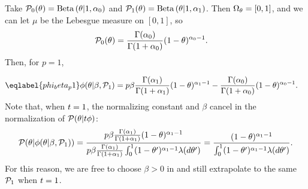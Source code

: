 \begin{ex}
%
Take $\mathcal{P}_{0}(\theta) = \mathrm{Beta}\left(\theta \vert 1, \alpha_0\right)$ and $\mathcal{P}_{1}(\theta) =
\mathrm{Beta}\left(\theta \vert 1, \alpha_1\right)$.  Then $\Omega_{\theta}=[0,1]$, and we can let
$\mu$ be the Lebesgue measure on $[0,1]$, so
%
\begin{align*}
%
\pbase(\theta) ={}&
    \frac{\Gamma(\alpha_0)}{\Gamma(1 + \alpha_0)} (1 - \theta)^{\alpha_0 - 1}.
%
\end{align*}
%
Then, for $p = 1$,

\begin{align}\eqlabel{phi_beta_p1}
%
\phi(\theta \vert \beta, \palt) ={}&
    p \beta \frac{\Gamma(\alpha_1)}{\Gamma(1 + \alpha_1)}
        (1 - \theta)^{\alpha_1 - 1} -
    \frac{\Gamma(\alpha_0)}{\Gamma(1 + \alpha_0)}
        (1 - \theta)^{\alpha_0 - 1}.
%
\end{align}
%
Note that, when $t = 1$, the normalizing constant and $\beta$ cancel in the
normalization of $\mathcal{P}(\theta \vert t \phi)$:
%
\begin{align*}
%
\p(\theta \vert \phi(\theta \vert \beta, \palt)) =
\frac{p \beta \frac{\Gamma(\alpha_1)}{\Gamma(1 + \alpha_1)}
        (1 - \theta)^{\alpha_1 - 1}}
     {p \beta \frac{\Gamma(\alpha_1)}{\Gamma(1 + \alpha_1)}
       \int_0^1 (1 - \theta')^{\alpha_1 - 1} \lambda(d\theta')}
=
\frac{(1 - \theta)^{\alpha_1 - 1}}
     {\int_0^1 (1 - \theta')^{\alpha_1 - 1} \lambda(d\theta')}.
%
\end{align*}
%
For this reason, we are free to choose $\beta > 0$ in 
and still extrapolate to the same $\mathcal{P}_{1}$ when $t = 1$.

\end{ex}




